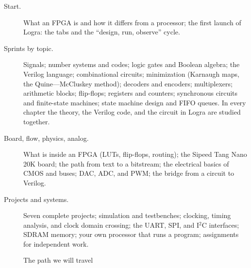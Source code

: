 \begin{description}
  \item[Start.] What an FPGA is and how it differs from a processor; the
    first launch of Logra: the tabs and the ``design, run, observe'' cycle.
  \item[Sprints by topic.] Signals; number systems and codes; logic gates and
    Boolean algebra; the Verilog language; combinational circuits;
    minimization (Karnaugh maps, the Quine---McCluskey method); decoders and
    encoders; multiplexers; arithmetic blocks; flip-flops; registers and
    counters; synchronous circuits and finite-state machines; state machine
    design and FIFO queues. In every chapter the theory, the Verilog code, and
    the circuit in Logra are studied together.
  \item[Board, flow, physics, analog.] What is inside an FPGA (LUTs,
    flip-flops, routing); the Sipeed Tang Nano 20K board; the path from text
    to a bitstream; the electrical basics of CMOS and buses; DAC, ADC, and
    PWM; the bridge from a circuit to Verilog.
  \item[Projects and systems.] Seven complete projects; simulation and
    testbenches; clocking, timing analysis, and clock domain crossing; the
    UART, SPI, and I$^2$C interfaces; SDRAM memory; your own processor that
    runs a program; assignments for independent work.
\end{description}

\begin{figure}[H]
\centering
{}
\caption{The path we will travel}
\end{figure}

